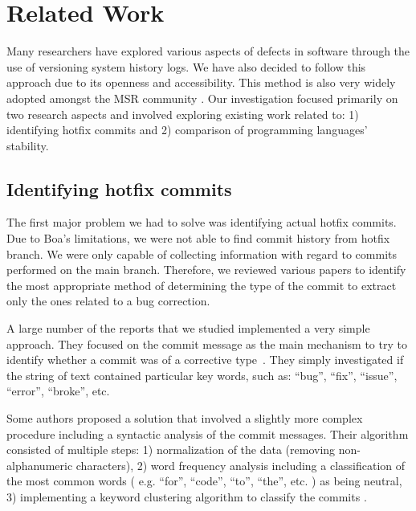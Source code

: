 \section{Related Work}
Many researchers have explored various aspects of defects in software through the use of versioning system history logs. We have also decided to follow this approach due to its openness and accessibility. This method is also very widely adopted amongst the MSR community \cite{Hattori2008}. Our investigation focused primarily on two research aspects and involved exploring existing work related to: 1) identifying hotfix commits and 2) comparison of programming languages' stability.


\subsection{Identifying hotfix commits}
The first major problem we had to solve was identifying actual hotfix commits. Due to Boa's limitations, we were not able to find commit history from hotfix branch. We were only capable of collecting information with regard to commits performed on the main branch. Therefore, we reviewed various papers to identify the most appropriate method of determining the type of the commit to extract only the ones related to a bug correction.\par

A large number of the reports that we studied implemented a very simple approach. They focused on the commit message as the main mechanism to try to identify whether a commit was of a corrective type~\cite{Hattori2008, Ratzinger2008, Hindle2008}. They simply investigated if the string of text contained particular key words, such as: ``bug'', ``fix'', ``issue'', ``error'', ``broke'', etc.\par

Some authors proposed a solution that involved a slightly more complex procedure including a syntactic analysis of the commit messages. Their algorithm consisted of multiple steps: 1) normalization of the data (removing non-alphanumeric characters), 2) word frequency analysis including a classification of the most common words ( e.g. ``for'', ``code'', ``to'', ``the'', etc. ) as being neutral, 3) implementing a keyword clustering algorithm to classify the commits \cite{Mockus2000}.\par

